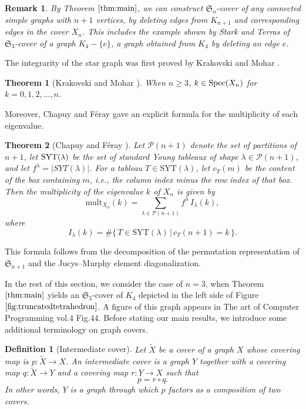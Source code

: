 \documentclass[lualatex,12pt]{article}
\newtheorem{thm}{Theorem}
\newtheorem{rmk}{Remark}
\newtheorem{definition}{Definition}
\begin{document}
\begin{rmk}
 By Theorem ${\ref{thm:main}}$, we can construct
 ${\mathfrak S}_n$-cover of any connected simple graphs
 with $n+1$ vertices, by deleting edges from $K_{n+1}$
 and corresponding edges in the cover $X_n$.
 This includes the example shown by Stark and Terras \cite{stark2000zeta} of
 ${\mathfrak S}_3$-cover of a graph $K_4-\{e\}$,
 a graph obtained from $K_4$ by deleting an edge $e$.
\end{rmk}

The integrarity of the star graph was first proved by
Krakovski and Mohar \cite{krakovski2012spectrum}.
\begin{thm}
[Krakovski and Mohar \cite{krakovski2012spectrum}]
\label{thm:kramoha}
When $n\geq 3$, $k\in {\rm Spec}(X_n)$ for $k=0,1,2,\ldots,n$.
\end{thm}
Moreover, Chapuy and F\'{e}ray \cite{ChapuyFeray} gave an explicit formula for the multiplicity of each eigenvalue.  
\begin{thm}
[Chapuy and F\'{e}ray \cite{ChapuyFeray}]
\label{thm:chapuyferay}
Let ${\mathcal P}(n+1)$ denote the set of partitions of $n+1$, 
let ${\rm SYT}(\lambda)$ be the set of standard Young tableaux  of 
shape $\lambda\in{\mathcal P}(n+1)$,
and let $f^\lambda=|SYT(\lambda)|$.  
For a tableau $T \in \mathrm{SYT}(\lambda)$, 
let $c_T(m)$ be the \emph{content} of the box containing $m$, 
i.e., the column index minus the row index of that box.  
Then the multiplicity of the eigenvalue $k$ of $X_n$ is given by
\[
\mathrm{mult}_{X_n}(k) = \sum_{\lambda \in {\mathcal P}(n+1)} f^\lambda \, I_\lambda(k),
\]
where
\[
I_\lambda(k) = \#\{\, T \in \mathrm{SYT}(\lambda) \,|\, c_T(n+1) = k \,\}.
\]
\end{thm}
This formula follows from the decomposition of the permutation representation of 
${\mathfrak S}_{n+1}$ and the Jucys–Murphy element diagonalization.



\bigskip
In the rest of this section, we consider the case of $n=3$,
 when Theorem $\ref{thm:main}$ yields
 an ${\mathfrak S}_3$-cover of $K_4$ depicted in the left side of
 Figure $\ref{fig:truncatedtetrahedron}$.
 A figure of this graph appears in The art of Computer Programming vol.$4$ 
 \cite{knuth2011taocp4a} Fig.$44$.
Before stating our main results, we introduce some additional terminology on graph covers.
\begin{definition}[Intermediate cover]
Let $\widetilde{X}$ be a cover of a graph $X$ whose covering map is
\(p:\widetilde{X}\to X\).
An \emph{intermediate cover} is a graph $Y$
together with a covering map \(q:\widetilde{X}\to Y\) and a covering map \(r:Y\to X\) such that
\[
p = r \circ q.
\]
In other words, \(Y\) is a graph through which \(p\) factors as a composition of two covers.
\end{definition}
\end{document}
